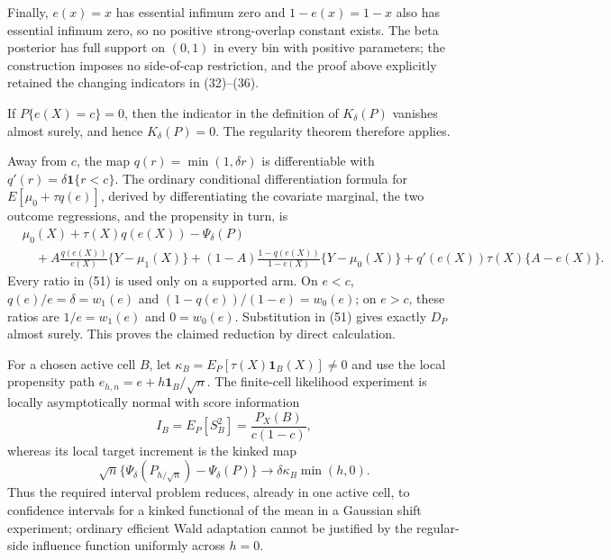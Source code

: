 Finally, \(e(x)=x\) has essential infimum zero and \(1-e(x)=1-x\) also has essential infimum zero, so no positive strong-overlap constant exists.  The beta posterior has full support on \((0,1)\) in every bin with positive parameters; the construction imposes no side-of-cap restriction, and the proof above explicitly retained the changing indicators in (32)--(36).

If \(P\{e(X)=c\}=0\), then the indicator in the definition of \(K_\delta(P)\) vanishes almost surely, and hence \(K_\delta(P)=0\).  The regularity theorem therefore applies.

Away from \(c\), the map \(q(r)=\min(1,\delta r)\) is differentiable with
\(q'(r)=\delta\mathbf1\{r<c\}\).  The ordinary conditional differentiation formula for
\(E[\mu_0+\tau q(e)]\), derived by differentiating the covariate marginal, the two outcome regressions, and the propensity in turn, is
\begin{equation}
\begin{aligned}
 &\mu_0(X)+\tau(X)q(e(X))-\Psi_\delta(P)\\
 &\quad+A\frac{q(e(X))}{e(X)}\{Y-\mu_1(X)\}
 +(1-A)\frac{1-q(e(X))}{1-e(X)}\{Y-\mu_0(X)\}
 +q'(e(X))\tau(X)\{A-e(X)\}.
\end{aligned}                                                                             \tag{51}
\end{equation}
Every ratio in (51) is used only on a supported arm.  On \(e<c\),
\(q(e)/e=\delta=w_1(e)\) and
\((1-q(e))/(1-e)=w_0(e)\); on \(e>c\), these ratios are
\(1/e=w_1(e)\) and \(0=w_0(e)\).  Substitution in (51) gives exactly \(D_P\) almost surely.  This proves the claimed reduction by direct calculation.

For a chosen active cell \(B\), let \(\kappa_B=E_P[\tau(X)\mathbf1_B(X)]\ne0\) and use the local propensity path \(e_{h,n}=e+h\mathbf1_B/\sqrt n\).  The finite-cell likelihood experiment is locally asymptotically normal with score information
\begin{equation}
 I_B=E_P[S_B^2]=\frac{P_X(B)}{c(1-c)},
\end{equation}
whereas its local target increment is the kinked map
\begin{equation}
 \sqrt n\{\Psi_\delta(P_{h/\sqrt n})-\Psi_\delta(P)\}
 \longrightarrow \delta\kappa_B\min(h,0).
\end{equation}
Thus the required interval problem reduces, already in one active cell, to confidence intervals for a kinked functional of the mean in a Gaussian shift experiment; ordinary efficient Wald adaptation cannot be justified by the regular-side influence function uniformly across \(h=0\).
